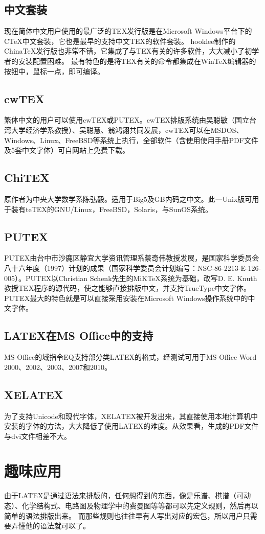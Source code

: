 \documentclass[12pt, UTF8, heading = false, scheme = plain]{ctexart}
\begin{document}
        \subsection{中文套装}
        现在简体中文用户使用的最广泛的TEX发行版是在Microsoft Windows平台下的CTeX中文套装，它也是最早的支持中文TEX的软件套装。
        hooklee制作的ChinaTeX发行版也非常不错，它集成了与TEX有关的许多软件，大大减小了初学者的安装配置困难。
        最有特色的是将TEX有关的命令都集成在WinTeX编辑器的按钮中，鼠标一点，即可编译。

        \subsection{cwTEX}
        繁体中文的用户可以使用cwTEX或PUTEX。cwTEX排版系统由吴聪敏（国立台湾大学经济学系教授）、吴聪慧、翁鸿翎共同发展，cwTEX可以在MSDOS、Windows、Linux、FreeBSD等系统上执行，全部软件（含使用使用手册PDF文件及5套中文字体）可自网站上免费下载。

        \subsection{ChiTEX}
        原作者为中央大学数学系陈弘毅。适用于Big5及GB内码之中文。此一Unix版可用于装有teTEX的GNU/Linux，FreeBSD，Solaris，与SunOS系统。

        \subsection{PUTEX}
        PUTEX由台中市沙鹿区静宜大学资讯管理系蔡奇伟教授发展，是国家科学委员会八十六年度（1997）计划的成果（国家科学委员会计划编号：NSC-86-2213-E-126-005）。PUTEX以Christian Schenk先生的MiKTeX系统为基础，改写D. E. Knuth教授TEX程序的源代码，使之能够直接排版中文，并支持TrueType中文字体。PUTEX最大的特色就是可以直接采用安装在Microsoft Windows操作系统中的中文字体。

        \subsection{LATEX在MS Office中的支持}
        MS Office的域指令EQ支持部分类LATEX的格式，经测试可用于MS Office Word 2000、2002、2003、2007和2010。

        \subsection{XELATEX}
        为了支持Unicode和现代字体，XELATEX被开发出来，其直接使用本地计算机中安装的字体的方法，大大降低了使用LATEX的难度。从效果看，生成的PDF文件与dvi文件相差不大。

    \section{趣味应用}
    由于LATEX是通过语法来排版的，任何想得到的东西，像是乐谱、棋谱（可动态）、化学结构式、电路图及物理学中的费曼图等等都可以先定义规则，然后再以简单的语法排版出来。
    而那些规则也往往早有人写出对应的宏包，所以用户只需要弄懂他的语法就可以了。

    
\end{document}
